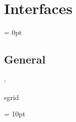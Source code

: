 
\section{Interfaces} 


\parskip = 0pt

\vspace{3mm} \subsection*{General}

: 

sgrid
\vspace{2mm}

\vspace{5mm}\parskip = 10pt 
